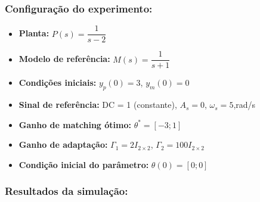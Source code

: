\documentclass[10pt]{article}
\begin{document}
\subsubsection{Configuração do experimento:}
\begin{itemize}
\item \textbf{Planta:} $P(s) = \dfrac{1}{s - 2}$
\item \textbf{Modelo de referência:} $M(s) = \dfrac{1}{s + 1}$
\item \textbf{Condições iniciais:} $y_p(0)=3$, $y_m(0)=0$
\item \textbf{Sinal de referência:} DC = 1 (constante), $A_s=0$, $\omega_s=5$,rad/s
\item \textbf{Ganho de matching ótimo:} $\theta^* = [-3;1]$
\item \textbf{Ganho de adaptação:} $\Gamma_1 = 2I_{2\times2}$, $\Gamma_2 = 100 I_{2\times2}$
\item \textbf{Condição inicial do parâmetro:} $\theta(0) = [0;0]$
\end{itemize}

\subsubsection{Resultados da simulação:}
\end{document}
